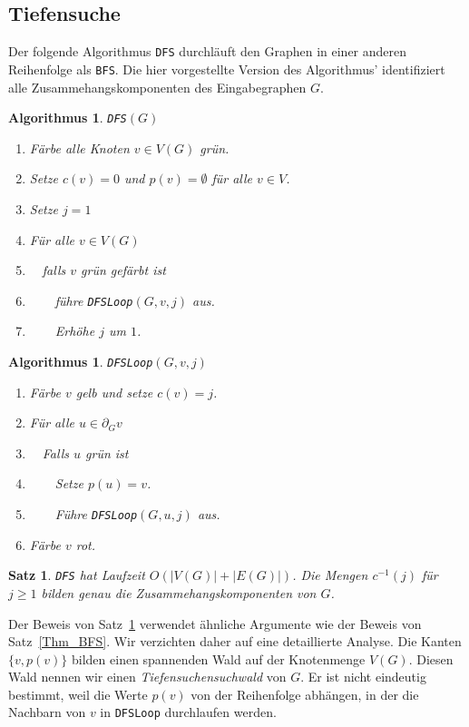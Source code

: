 \documentclass[10pt,reqno]{amsart}
\numberwithin{equation}{section}
\newtheorem{theorem}[definition]{Satz}
\newtheorem{algorithm}[definition]{Algorithmus}
\newcommand\Thm{Satz}
\begin{document}
\subsection{Tiefensuche}\label{sec_dfs}
Der folgende Algorithmus {\tt DFS} durchl\"auft den Graphen in einer anderen Reihenfolge als {\tt BFS}.
Die hier vorgestellte Version des Algorithmus' identifiziert alle Zusammehangskomponenten des Eingabegraphen $G$.

\begin{algorithm}{\tt DFS}$(G)$
	\begin{enumerate}
		\item F\"arbe alle Knoten $v\in V(G)$ gr\"un.
		\item Setze $c(v)=0$ und $p(v)=\emptyset$ f\"ur alle $v\in V$.
		\item Setze $j=1$
		\item F\"ur alle $v\in V(G)$
		\item $\quad$falls $v$ gr\"un gef\"arbt ist
		\item $\quad\quad$f\"uhre {\tt DFSLoop}$(G,v,j)$ aus.
		\item $\quad\quad$Erh\"ohe $j$ um $1$.
	\end{enumerate}
\end{algorithm}

\begin{algorithm}{\tt DFSLoop}$(G,v,j)$
	\begin{enumerate}
		\item F\"arbe $v$ gelb und setze $c(v)=j$.
		\item F\"ur alle $u\in\partial_Gv$
		\item $\quad$Falls $u$ gr\"un ist
		\item $\quad\quad$Setze $p(u)=v$.
		\item $\quad\quad$F\"uhre {\tt DFSLoop}$(G,u,j)$ aus.
		\item F\"arbe $v$ rot.
	\end{enumerate}
\end{algorithm}

\begin{theorem}\label{thm_dfs}
	{\tt DFS} hat Laufzeit $O(|V(G)|+|E(G)|)$.
	Die Mengen $c^{-1}(j)$ f\"ur $j\geq1$ bilden genau die Zusammehangskomponenten von $G$.
\end{theorem}

Der Beweis von \Thm~\ref{thm_dfs} verwendet \"ahnliche Argumente wie der Beweis von \Thm~\ref{Thm_BFS}.
Wir verzichten daher auf eine detaillierte Analyse.
Die Kanten $\{v,p(v)\}$ bilden einen spannenden Wald auf der Knotenmenge $V(G)$.
Diesen Wald nennen wir einen {\em Tiefensuchensuchwald} von $G$.
Er ist nicht eindeutig bestimmt, weil die Werte $p(v)$ von der Reihenfolge abh\"angen, in der die Nachbarn von $v$ in {\tt DFSLoop} durchlaufen werden.
\end{document}
